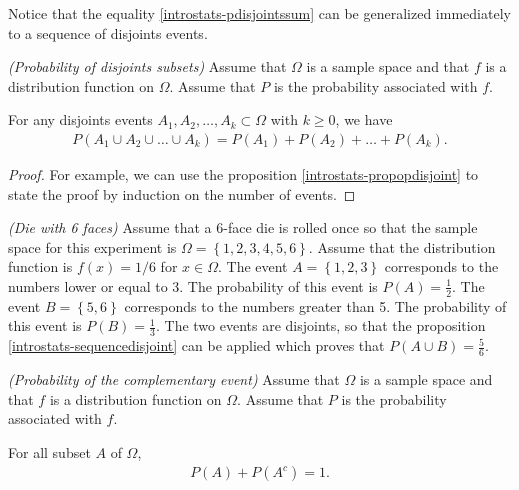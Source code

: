 Notice that the equality \ref{introstats-pdisjointssum} can be generalized immediately
to a sequence of disjoints events.

\begin{proposition}
\emph{(Probability of disjoints subsets)}
\label{introstats-sequencedisjoint}
Assume that $\Omega$ is a sample space and that $f$ is a distribution
function on $\Omega$. Assume that $P$ is the probability associated with
$f$.

For any disjoints events $A_1, A_2, \ldots , A_k\subset \Omega$ with $k\geq 0$, we have
\begin{eqnarray}
P\left(A_1 \cup A_2 \cup \ldots \cup A_k \right) = 
P(A_1) + P(A_2) + \ldots + P(A_k)\label{introstats-pdisjointssumk}.
\end{eqnarray}
\end{proposition}

\begin{proof}
For example, we can use the proposition \ref{introstats-propopdisjoint} 
to state the proof by induction on the number of events.
\end{proof}

\begin{example}
\emph{(Die with 6 faces)}
\label{introstats-die6faces3}
Assume that a 6-face die is rolled once so that the sample space for this experiment is
$\Omega=\left\{1,2,3,4,5,6\right\}$.
Assume that the distribution function is $f(x)=1/6$ for $x\in\Omega$.
The event $A=\left\{1,2,3\right\}$ corresponds to the numbers lower or equal to 3.
The probability of this event is $P(A)= \frac{1}{2}$. 
The event $B=\left\{5,6\right\}$ corresponds to the numbers greater than 5.
The probability of this event is $P(B)=\frac{1}{3}$.
The two events are disjoints, so that the proposition 
\ref{introstats-sequencedisjoint} can be applied which proves that $P(A\cup B) = \frac{5}{6}$.
\end{example}

\begin{proposition}
\emph{(Probability of the complementary event)}
\label{introstats-propocomplem}
Assume that $\Omega$ is a sample space and that $f$ is a distribution
function on $\Omega$. Assume that $P$ is the probability associated with
$f$.

For all subset $A$ of $\Omega$, 
\begin{eqnarray}
P(A) + P(A^c) = 1. \label{introstats-theoremcomplem}
\end{eqnarray}
\end{proposition}

